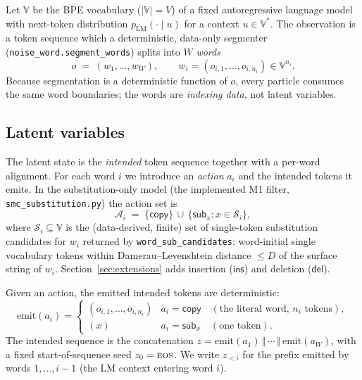 \documentclass[11pt]{article}
\newcommand{\copyact}{\textsf{copy}}
\newcommand{\subact}{\textsf{sub}}
\newcommand{\inssact}{\textsf{ins}}
\newcommand{\delact}{\textsf{del}}
\newcommand{\given}{\mid}
\newcommand{\pLM}{p_{\mathrm{LM}}}
\newcommand{\eos}{\textsc{eos}}
\newcommand{\Vocab}{\mathbb{V}}
\newcommand{\code}[1]{\texttt{#1}}
\begin{document}
Let $\Vocab$ be the BPE vocabulary ($|\Vocab| = V$) of a fixed autoregressive language model with
next-token distribution $\pLM(\cdot \given u)$ for a context $u \in \Vocab^{*}$. The observation is a
token sequence which a deterministic, data-only segmenter (\code{noise\_word.segment\_words})
splits into $W$ \emph{words}
\begin{equation}
  o \;=\; (w_1, \dots, w_W), \qquad w_i = (o_{i,1}, \dots, o_{i,n_i}) \in \Vocab^{n_i}.
\end{equation}
Because segmentation is a deterministic function of $o$, every particle consumes the same word
boundaries; the words are \emph{indexing data}, not latent variables.

\subsection{Latent variables}

The latent state is the \emph{intended} token sequence together with a per-word alignment. For each
word $i$ we introduce an \emph{action} $a_i$ and the intended tokens it emits. In the
substitution-only model (the implemented M1 filter, \code{smc\_substitution.py}) the action set is
\begin{equation}
  \mathcal{A}_i \;=\; \{\copyact\} \,\cup\, \{\subact_x : x \in \mathcal{S}_i\},
\end{equation}
where $\mathcal{S}_i \subseteq \Vocab$ is the (data-derived, finite) set of single-token
substitution candidates for $w_i$ returned by \code{word\_sub\_candidates}: word-initial single
vocabulary tokens within Damerau--Levenshtein distance $\le D$ of the surface string of $w_i$.
Section~\ref{sec:extensions} adds insertion ($\inssact$) and deletion ($\delact$).

Given an action, the emitted intended tokens are deterministic:
\begin{equation}
  \mathrm{emit}(a_i) =
  \begin{cases}
    (o_{i,1}, \dots, o_{i,n_i}) & a_i = \copyact \quad (\text{the literal word, $n_i$ tokens}),\\[2pt]
    (x) & a_i = \subact_x \quad (\text{one token}).
  \end{cases}
\end{equation}
The intended sequence is the concatenation $z = \mathrm{emit}(a_1) \,\Vert\, \cdots \,\Vert\,
\mathrm{emit}(a_W)$, with a fixed start-of-sequence seed $z_0 = \eos$. We write $z_{<i}$ for the
prefix emitted by words $1,\dots,i-1$ (the LM context entering word $i$).
\end{document}
